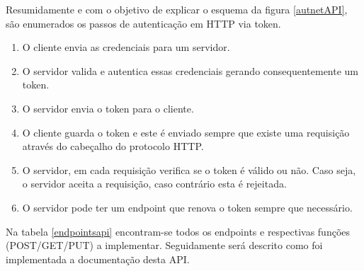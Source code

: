 Resumidamente e com o objetivo de explicar o esquema da figura \ref{autnetAPI}, são enumerados os passos de autenticação em HTTP via token. 

\begin{enumerate}
	\item O cliente envia as credenciais para um servidor.
	\item O servidor valida e autentica essas credenciais gerando consequentemente um token.
	\item O servidor envia o token para o cliente.
	\item O cliente guarda o token e este é enviado sempre que existe uma requisição através do cabeçalho do protocolo HTTP. 
	\item O servidor, em cada requisição verifica se o token é válido ou não. Caso seja, o servidor aceita a requisição, caso contrário esta é rejeitada.
	\item O servidor pode ter um endpoint que renova o token sempre que necessário. 
\end{enumerate}




Na tabela \ref{endpointsapi} encontram-se todos os endpoints e respectivas funções (POST/GET/PUT) a implementar. Seguidamente será descrito como foi implementada a documentação desta API.  


